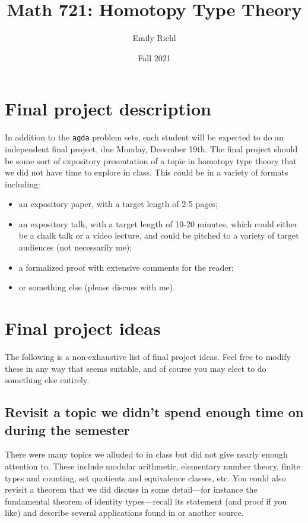\documentclass{amsart}
\title{Math 721: Homotopy Type Theory}
\author{Emily Riehl}
\theoremstyle{definition}
\theoremstyle{remark}
\numberwithin{equation}{section}
\begin{document}
\date{Fall 2021}


\address{Dept.~of Mathematics\\Johns Hopkins Univ.\\ 3400 N.~Charles Street \\ Baltimore, MD 21218}


\maketitle


\section*{Final project description}

In addition to the \texttt{agda} problem sets, each student will be expected to do an independent final project, due Monday, December 19th. The final project should be some sort of expository presentation of a topic in homotopy type theory that we did not have time to explore in class. This could be in a variety of formats including:
\begin{itemize}
\item an expository paper, with a target length of 2-5 pages;
\item an expository talk, with a target length of 10-20 minutes, which could either be a chalk talk or a video lecture, and could be pitched to a variety of target audiences (not necessarily me);
\item a formalized proof with extensive comments for the reader;
\item or something else (please discuss with me).
\end{itemize}

\section*{Final project ideas}

The following is a non-exhaustive list of final project ideas. Feel free to modify these in any way that seems suitable, and of course you may elect to do something else entirely.

\subsection*{Revisit a topic we didn't spend enough time on during the semester} There were many topics we alluded to in class but did not give nearly enough attention to. These include modular arithmetic, elementary number theory, finite types and counting,  set quotients and equivalence classes, etc. You could also revisit a theorem that we did discuss in some detail---for instance the fundamental theorem of identity types---recall its statement (and proof if you like) and describe several applications found in \cite{Rijke} or another source.
\end{document}
